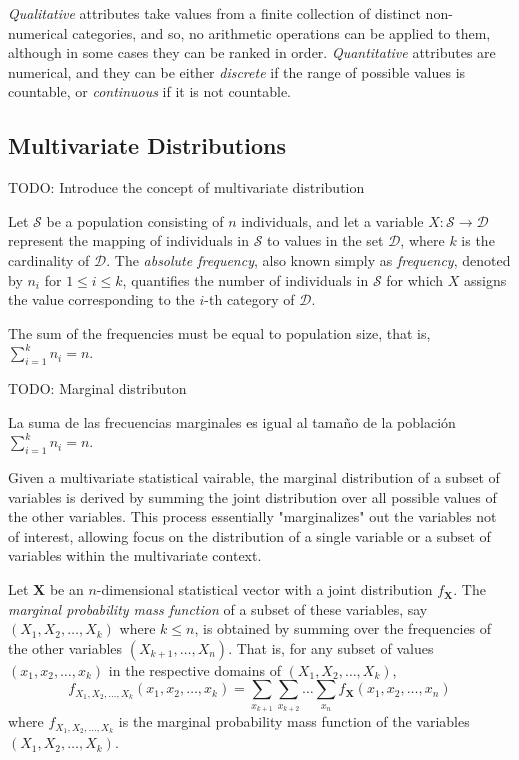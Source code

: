 \emph{Qualitative} attributes take values from a finite collection of distinct non-numerical categories, and so, no arithmetic operations can be applied to them, although in some cases they can be ranked in order. \emph{Quantitative} attributes are numerical, and they can be either \emph{discrete} if the range of possible values is countable, or \emph{continuous} if it is not countable.


\subsection{Multivariate Distributions}
\label{sec:multivariate_distributions}

{\color{red} TODO: Introduce the concept of multivariate distribution}

\begin{definition}
Let $\mathcal{S}$ be a population consisting of $n$ individuals, and let a variable $X: \mathcal{S} \rightarrow \mathcal{D}$ represent the mapping of individuals in $\mathcal{S}$ to values in the set $\mathcal{D}$, where $k$ is the cardinality of $\mathcal{D}$. The \emph{absolute frequency}, also known simply as \emph{frequency}, denoted by $n_i$ for $1 \leq i \leq k$, quantifies the number of individuals in $\mathcal{S}$ for which $X$ assigns the value corresponding to the $i$-th category of $\mathcal{D}$.
\end{definition}

The sum of the frequencies must be equal to population size, that is, $\sum_{i=1}^k n_i = n$.


{\color{red} TODO: Marginal distributon}

La suma de las frecuencias marginales es igual al tamaño de la población $\sum_{i=1}^k n_i = n$.

Given a multivariate statistical vairable, the marginal distribution of a subset of variables is derived by summing the joint distribution over all possible values of the other variables. This process essentially "marginalizes" out the variables not of interest, allowing focus on the distribution of a single variable or a subset of variables within the multivariate context.

\begin{definition}
Let $\mathbf{X}$ be an $n$-dimensional statistical vector with a joint distribution $f_\mathbf{X}$. The \emph{marginal probability mass function} of a subset of these variables, say $(X_1, X_2, \ldots, X_k)$ where $k \leq n$, is obtained by summing over the frequencies of the other variables $(X_{k+1}, \ldots, X_n)$. That is, for any subset of values $(x_1, x_2, \ldots, x_k)$ in the respective domains of $(X_1, X_2, \ldots, X_k)$,
\[
f_{X_1, X_2, \ldots, X_k}(x_1, x_2, \ldots, x_k) = \sum_{x_{k+1}} \sum_{x_{k+2}} \ldots \sum_{x_n} f_\mathbf{X}(x_1, x_2, \ldots, x_n)
\]
where $f_{X_1, X_2, \ldots, X_k}$ is the marginal probability mass function of the variables $(X_1, X_2, \ldots, X_k)$.
\end{definition}


